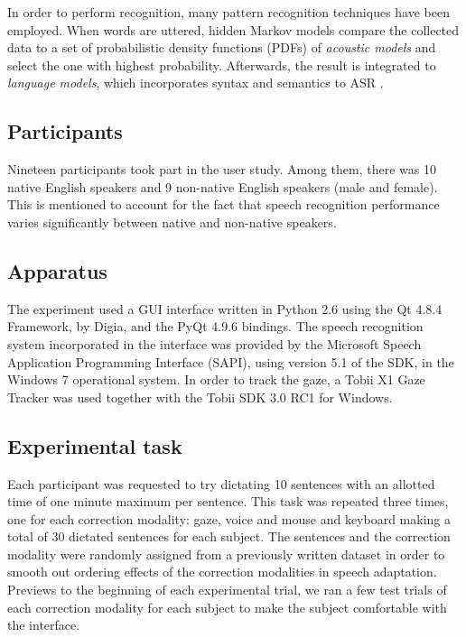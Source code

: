 \documentclass[]{article}
\begin{document}
In order to perform recognition, many pattern recognition techniques have been employed. When words are uttered, hidden
Markov models compare the collected data to a set of probabilistic density functions (PDFs) of \textit{acoustic models}
and select the one with highest probability. Afterwards, the result is integrated to \textit{language models}, which
incorporates syntax and semantics to ASR \cite{Douglas2008}.


\subsection{Participants}
Nineteen participants took part in the user study. Among them, there was 10 native English speakers and 9 non-native
English speakers (male and female). This is mentioned to account for the fact that speech recognition performance varies
significantly between native and non-native speakers.


\subsection{Apparatus}
The experiment used a GUI interface written in Python 2.6 using the Qt 4.8.4 Framework, by Digia, and the PyQt 4.9.6
bindings. The speech recognition system incorporated in the interface was provided by the Microsoft Speech Application
Programming Interface (SAPI), using version 5.1 of the SDK, in the Windows 7 operational system. In order to track
the gaze, a Tobii X1 Gaze Tracker was used together with the Tobii SDK 3.0 RC1 for Windows.


\subsection{Experimental task}
Each participant was requested to try dictating 10 sentences with an allotted time of one minute maximum per sentence.
This task was repeated three times, one for each correction modality: gaze, voice and mouse and keyboard making a total
of 30 dictated sentences for each subject. The sentences and the correction modality were randomly assigned from a
previously written dataset in order to smooth out ordering effects of the correction modalities in speech adaptation.
Previews to the beginning of each experimental trial, we ran a few test trials of each correction modality for each
subject to make the subject comfortable with the interface.
\end{document}
